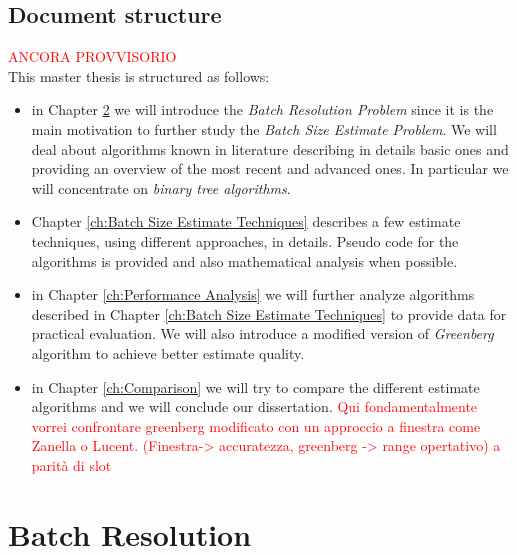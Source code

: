 \documentclass[12pt,a4paper]{report}
\begin{document}
\section{Document structure}
\textcolor{red}{ANCORA PROVVISORIO}\\
This master thesis is structured as follows:
\begin{itemize}
\item in Chapter \ref{ch:Batch Resolution} we will introduce the \emph{Batch Resolution Problem} since it is the main motivation to further study the \emph{Batch Size Estimate Problem}. We will deal about algorithms known in literature describing in details basic ones and providing an overview of the most recent and advanced ones. In particular we will concentrate on \emph{binary tree algorithms}.
\item Chapter \ref{ch:Batch Size Estimate Techniques}  describes a few estimate techniques, using different approaches, in details.  Pseudo code for the algorithms is provided  and also mathematical analysis when possible. 

\item in Chapter \ref{ch:Performance Analysis} we will further analyze algorithms described in Chapter \ref{ch:Batch Size Estimate Techniques} to provide data for practical evaluation. We will also introduce a modified version of \emph{Greenberg} algorithm to achieve better estimate quality.
\item in Chapter \ref{ch:Comparison} we will try to compare the different estimate algorithms and we will conclude our dissertation. \textcolor{red}{Qui fondamentalmente vorrei confrontare greenberg modificato con un approccio a finestra come Zanella o Lucent. (Finestra-> accuratezza, greenberg -> range opertativo)  a parità di slot }\\
\end{itemize}

 

\chapter{Batch Resolution}
\label{ch:Batch Resolution}
\end{document}
